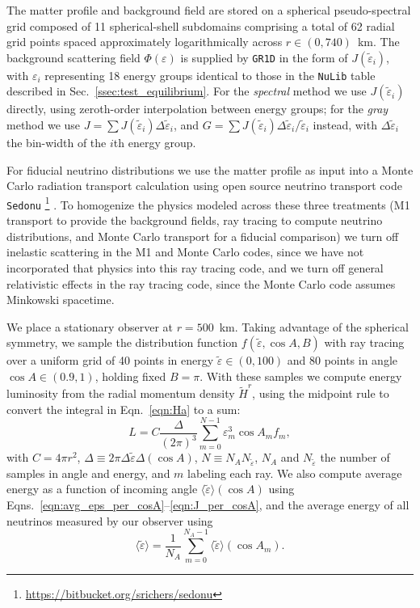\documentclass[aps,floatfix,prd,superscriptaddress,twocolumn]{revtex4-1}
\begin{document}
The matter profile and background field are stored on a spherical
pseudo-spectral grid composed of 11 spherical-shell subdomains
\cite{kidd2000-spec,szil2009-spec}
comprising a total of 62 radial grid points spaced approximately
logarithmically across $r\in(0,740)$~km.
The background scattering field $\Phi(\varepsilon)$ is supplied by
\lstinline{GR1D} in the form of $J(\tilde{\varepsilon}_i)$,
with $\varepsilon_i$ representing 18 energy groups
identical to those in the \lstinline{NuLib} table described in
Sec.~\ref{ssec:test_equilibrium}.
For the \emph{spectral} method we use $J(\tilde{\varepsilon}_i)$ directly,
using zeroth-order interpolation between energy groups;
for the \emph{gray} method we use $J=\sum J(\tilde{\varepsilon}_i) \Delta\tilde{\varepsilon}_i$,
and $G=\sum J(\tilde{\varepsilon}_i) \Delta\tilde{\varepsilon}_i/\tilde{\varepsilon}_i$ instead,
with $\Delta\tilde{\varepsilon}_i$ the bin-width of the $i$th energy group.

For fiducial neutrino distributions we use the matter profile
as input into a Monte Carlo radiation transport calculation using
open source neutrino transport code \lstinline{Sedonu}
\footnote{\url{https://bitbucket.org/srichers/sedonu}}
\cite{rich2015-monte_carlo}.
To homogenize the physics modeled across these three treatments
(M1 transport to provide the background fields,
ray tracing to compute neutrino distributions, and
Monte Carlo transport for a fiducial comparison)
we turn off inelastic scattering in the M1 and Monte Carlo codes,
since we have not incorporated that physics into this ray tracing code,
and we turn off general relativistic effects in the ray tracing code,
since the Monte Carlo code assumes Minkowski spacetime.

We place a stationary observer at $r=500$~km.
Taking advantage of the spherical symmetry, we sample the distribution function
$f(\tilde{\varepsilon},\cos A,B)$ with ray tracing
over a uniform grid of 40 points in energy $\tilde{\varepsilon}\in(0,100)$
and 80 points in angle $\cos A\in(0.9,1)$, holding fixed $B=\pi$.
With these samples we compute energy luminosity from the
radial momentum density $\tilde{H}^r$,
using the midpoint rule to convert the integral in Eqn.~\ref{eqn:Ha} to a sum:
\begin{equation}
  \label{eqn:L_minkowski}
  L =
  C \frac{\Delta}{(2\pi)^3} \sum\limits_{m=0}^{N-1} \varepsilon_m^3
  \cos A_m f_m,
\end{equation}
with $C=4\pi r^2$,
$\Delta \equiv 2\pi\Delta\tilde{\varepsilon}\Delta(\cos A)$,
$N \equiv N_A N_{\tilde{\varepsilon}}$,
$N_A$ and $N_{\tilde{\varepsilon}}$ the number of samples in angle and energy,
and $m$ labeling each ray.
We also compute average energy as a function of incoming angle
$\langle\tilde{\varepsilon}\rangle(\cos A)$ using
Eqns.~\ref{eqn:avg_eps_per_cosA}--\ref{eqn:J_per_cosA},
and the average energy of all neutrinos measured by our observer using
\begin{equation}
  \label{eqn:avg_eps_minkowski}
  \langle\tilde{\varepsilon}\rangle =
  \frac{1}{N_A}\sum\limits_{m=0}^{N_A-1}\langle\tilde{\varepsilon}\rangle(\cos A_m).
\end{equation}
\end{document}
